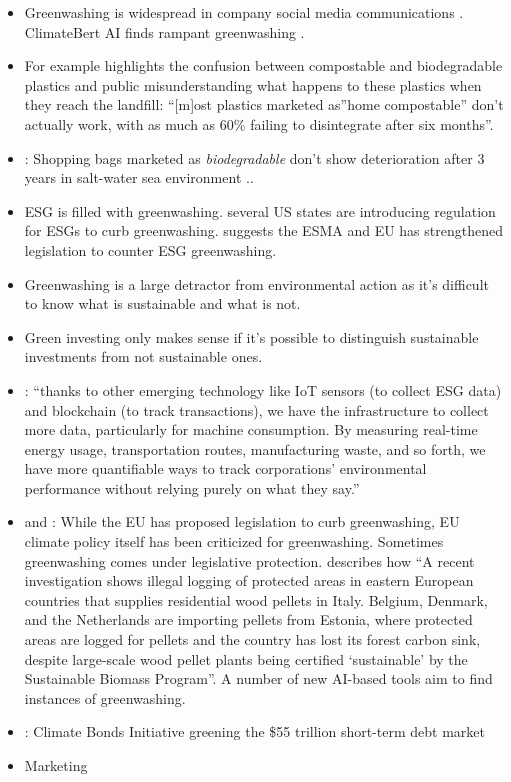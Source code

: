 \documentclass[
  letterpaper,
  DIV=11,
  numbers=noendperiod]{scrartcl}
\begin{document}
\begin{itemize}
\item
  Greenwashing is widespread in company social media communications
  \citep{geoffreysupranThreeShadesGreen2022}. ClimateBert AI finds
  rampant greenwashing
  \citep{binglerCheapTalkCherryPicking2021, sahotaAIAnalysis8002021}.
\item
  For example \citet{purkissBigCompostExperiment2022} highlights the
  confusion between compostable and biodegradable plastics and public
  misunderstanding what happens to these plastics when they reach the
  landfill: ``{[}m{]}ost plastics marketed as''home compostable'' don't
  actually work, with as much as 60\% failing to disintegrate after six
  months''.
\item
  \citet{napperEnvironmentalDeteriorationBiodegradable2019}: Shopping
  bags marketed as \emph{biodegradable} don't show deterioration after 3
  years in salt-water sea environment ..
\item
  \citet{chenxiyuHowAICan2021} ESG is filled with greenwashing.
  \citet{AntiESGCrusadeUS2023} several US states are introducing
  regulation for ESGs to curb greenwashing.
  \citet{francesschwartzkopffEUExploresTighter2022} suggests the ESMA
  and EU has strengthened legislation to counter ESG greenwashing.
\item
  Greenwashing is a large detractor from environmental action as it's
  difficult to know what is sustainable and what is not.
\item
  Green investing only makes sense if it's possible to distinguish
  sustainable investments from not sustainable ones.
\item
  \citet{sahotaAIAnalysis8002021}: ``thanks to other emerging technology
  like IoT sensors (to collect ESG data) and blockchain (to track
  transactions), we have the infrastructure to collect more data,
  particularly for machine consumption. By measuring real-time energy
  usage, transportation routes, manufacturing waste, and so forth, we
  have more quantifiable ways to track corporations' environmental
  performance without relying purely on what they say.''
\item
  \citet{fredericsimonCommissionFireIncluding2020} and
  \citet{kirataylorEUPlanPuts2021}: While the EU has proposed
  legislation to curb greenwashing, EU climate policy itself has been
  criticized for greenwashing. Sometimes greenwashing comes under
  legislative protection. \citet{boothBurningCarbonSink2022} describes
  how ``A recent investigation shows illegal logging of protected areas
  in eastern European countries that supplies residential wood pellets
  in Italy. Belgium, Denmark, and the Netherlands are importing pellets
  from Estonia, where protected areas are logged for pellets and the
  country has lost its forest carbon sink, despite large-scale wood
  pellet plants being certified `sustainable' by the Sustainable Biomass
  Program''. A number of new AI-based tools aim to find instances of
  greenwashing.
\item
  \citet{ClimateBondsInitiative2022}: Climate Bonds Initiative greening
  the \$55 trillion short-term debt market
\item
  Marketing


\end{itemize}
\end{document}
